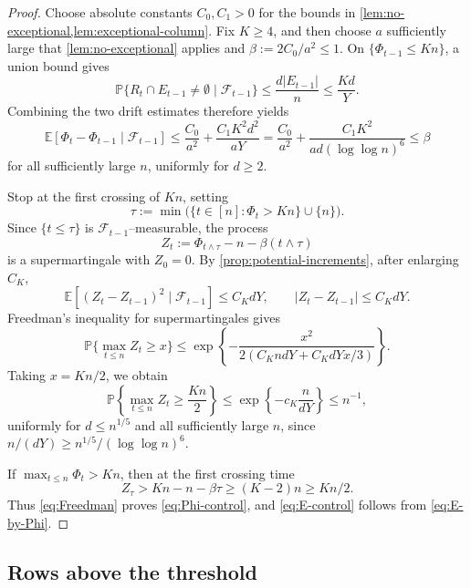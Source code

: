 \documentclass[reqno,english]{amsart}
\newcommand*{\PP}{\mathbb P}
\newcommand*{\EE}{\mathbb E}
\newcommand*{\calF}{\mathcal F}
\theoremstyle{definition}
\begin{document}
\begin{proof}
{
Choose absolute constants $C_0,C_1>0$ for the bounds in
\cref{lem:no-exceptional,lem:exceptional-column}. Fix $K\ge4$, and then
choose $a$ sufficiently large that \cref{lem:no-exceptional} applies and
$\beta:=2C_0/a^2\le1$. On $\{\Phi_{t-1}\le Kn\}$, a union bound gives
\begin{equation}\label{eq:bad-step-probability}
 \PP\{R_t\cap E_{t-1}\ne\emptyset\mid\calF_{t-1}\}
 \le\frac{d|E_{t-1}|}{n}\le\frac{Kd}{Y}.
\end{equation}
Combining the two drift estimates therefore yields
\[
 \EE[\Phi_t-\Phi_{t-1}\mid\calF_{t-1}]
 \le\frac{C_0}{a^2}+\frac{C_1K^2d^2}{aY}
 =\frac{C_0}{a^2}+\frac{C_1K^2}{ad(\log\log n)^6}
 \le\beta
\]
for all sufficiently large $n$, uniformly for $d\ge2$.

Stop at the first crossing of $Kn$, setting
\[
 \tau:=\min\big(\{t\in[n]:\Phi_t>Kn\}\cup\{n\}\big).
\]
Since $\{t\le\tau\}$ is $\calF_{t-1}$--measurable, the process
\begin{equation}\label{eq:Z-def}
 Z_t:=\Phi_{t\wedge\tau}-n-\beta(t\wedge\tau)
\end{equation}
is a supermartingale with $Z_0=0$. By
\cref{prop:potential-increments}, after enlarging $C_K$,
\begin{equation}\label{eq:Z-variance-increment}
 \EE[(Z_t-Z_{t-1})^2\mid\calF_{t-1}]\le C_KdY,
 \qquad
 |Z_t-Z_{t-1}|\le C_KdY.
\end{equation}
Freedman's inequality for supermartingales \cite{freedman} gives
\[
 \PP\{\max_{t\le n}Z_t\ge x\}
 \le\exp\left\{-\frac{x^2}{2(C_KndY+C_KdYx/3)}\right\}.
\]
Taking $x=Kn/2$, we obtain
\begin{equation}\label{eq:Freedman}
 \PP\left\{\max_{t\le n}Z_t\ge\frac{Kn}{2}\right\}
 \le\exp\left\{-c_K\frac{n}{dY}\right\}\le n^{-1},
\end{equation}
uniformly for $d\le n^{1/5}$ and all sufficiently large $n$, since
$n/(dY)\ge n^{1/5}/(\log\log n)^6$.

If $\max_{t\le n}\Phi_t>Kn$, then at the first crossing time
\[
 Z_\tau>Kn-n-\beta\tau\ge(K-2)n\ge Kn/2.
\]
Thus \eqref{eq:Freedman} proves \eqref{eq:Phi-control}, and
\eqref{eq:E-control} follows from \eqref{eq:E-by-Phi}.
}
\end{proof}

\subsection{Rows above the threshold}\label{sec:above-threshold}
\end{document}

